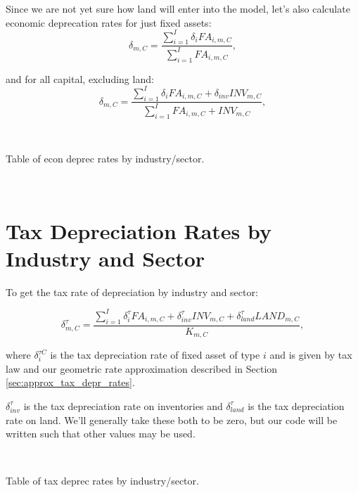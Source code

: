 \documentclass[article,11pt,letterpaper,fleqn]{article}
\theoremstyle{definition}
\numberwithin{equation}{section}
\begin{document}
 Since we are not yet sure how land will enter into the model, let's also calculate economic deprecation rates for just fixed assets:
 \begin{equation}
\label{eqn:econ_deprec_FA}
\delta_{m,C}=\frac{\sum_{i=1}^{I}\delta_{i}{FA}_{i,m,C}}{\sum_{i=1}^{I}FA_{i,m,C}},
\end{equation}
 
 and for all capital, excluding land:
 \begin{equation}
\label{eqn:econ_deprec_notland}
\delta_{m,C}=\frac{\sum_{i=1}^{I}\delta_{i}{FA}_{i,m,C}+\delta_{inv}{INV}_{m,C}}{\sum_{i=1}^{I}FA_{i,m,C} + INV_{m,C}},
\end{equation}
 

\ \\
\begin{center}
Table of econ deprec rates by industry/sector.
\end{center}
\ \\


\section{Tax Depreciation Rates by Industry and Sector}
\label{sec:tax_rates_sector}

 To get the tax rate of depreciation by industry and sector: 

\begin{equation}
\label{eqn:tax_deprec}
\delta^{\tau}_{m,C}=\frac{\sum_{i=1}^{I}\delta^{\tau}_{i}{FA}_{i,m,C}+\delta^{\tau}_{inv}{INV}_{m,C}+\delta^{\tau}_{land}{LAND}_{m,C}}{K_{m,C}},
\end{equation}

\noindent\noindent where $\delta^{\tau C}_{i}$ is the tax depreciation rate of fixed asset of type $i$ and is given by tax law and our geometric rate approximation described in Section \ref{sec:approx_tax_depr_rates}.

$\delta^{\tau}_{inv}$ is the tax depreciation rate on inventories and $\delta^{\tau}_{land}$ is the tax depreciation rate on land.  We'll generally take these both to be zero, but our code will be written such that other values may be used. 

\ \\
\begin{center}
Table of tax deprec rates by industry/sector.
\end{center}
\ \\



\end{document}
